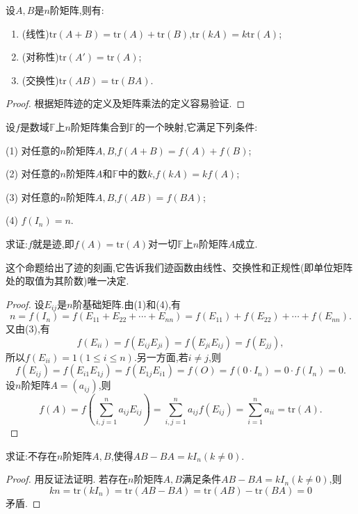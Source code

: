 \documentclass[lang=cn,newtx,10pt,scheme=chinese]{elegantbook}
\begin{document}
\begin{proposition}[矩阵迹的性质]\label{proposition:矩阵矩阵迹的性质}
设\(A,B\)是\(n\)阶矩阵,则有:
\begin{enumerate}
\item (线性)\(\mathrm{tr}(A + B)=\mathrm{tr}(A)+\mathrm{tr}(B)\),\(\mathrm{tr}(kA)=k\mathrm{tr}(A)\);
\item (对称性)\(\mathrm{tr}(A')=\mathrm{tr}(A)\);
\item (交换性)\(\mathrm{tr}(AB)=\mathrm{tr}(BA)\).
\end{enumerate}
\end{proposition}
\begin{proof}
根据矩阵迹的定义及矩阵乘法的定义容易验证.
\end{proof}

\begin{proposition}[矩阵迹的刻画]\label{proposition:矩阵迹的刻画}
设\(f\)是数域\(\mathbb{F}\)上\(n\)阶矩阵集合到\(\mathbb{F}\)的一个映射,它满足下列条件:

(1) 对任意的\(n\)阶矩阵\(A,B\),\(f(A + B)=f(A)+f(B)\);

(2) 对任意的\(n\)阶矩阵\(A\)和\(\mathbb{F}\)中的数\(k\),\(f(kA)=kf(A)\);

(3) 对任意的\(n\)阶矩阵\(A,B\),\(f(AB)=f(BA)\);

(4) \(f(I_n)=n\).

求证:\(f\)就是迹,即\(f(A)=\mathrm{tr}(A)\)对一切\(\mathbb{F}\)上\(n\)阶矩阵\(A\)成立.
\end{proposition}
\begin{note}
这个命题给出了迹的刻画,它告诉我们迹函数由线性、交换性和正规性(即单位矩阵处的取值为其阶数)唯一决定.
\end{note}
\begin{proof}
设\(E_{ij}\)是\(n\)阶基础矩阵.由(1)和(4),有
\[
n = f(I_n)=f(E_{11}+E_{22}+\cdots+E_{nn})=f(E_{11})+f(E_{22})+\cdots+f(E_{nn}).
\]
又由(3),有
\[
f(E_{ii})=f(E_{ij}E_{ji})=f(E_{ji}E_{ij})=f(E_{jj}),
\]
所以\(f(E_{ii}) = 1(1\leq i\leq n)\).另一方面,若\(i\neq j\),则
\[
f(E_{ij})=f(E_{i1}E_{1j})=f(E_{1j}E_{i1})=f(O)=f(0\cdot I_n)=0\cdot f(I_n)=0.
\]
设\(n\)阶矩阵\(A=(a_{ij})\),则
\[
f(A)=f\left(\sum_{i,j = 1}^{n}a_{ij}E_{ij}\right)=\sum_{i,j = 1}^{n}a_{ij}f(E_{ij})=\sum_{i = 1}^{n}a_{ii}=\mathrm{tr}(A).
\]
\end{proof}

\begin{example}
求证:不存在\(n\)阶矩阵\(A,B\),使得\(AB - BA = kI_n(k\neq0)\).
\end{example}
\begin{proof}
用反证法证明. 若存在\(n\)阶矩阵\(A,B\)满足条件\(AB - BA = kI_n(k\neq0)\),则
\[
kn=\mathrm{tr}(kI_n)=\mathrm{tr}(AB - BA)=\mathrm{tr}(AB)-\mathrm{tr}(BA)=0
\]
矛盾.
\end{proof}
\end{document}

